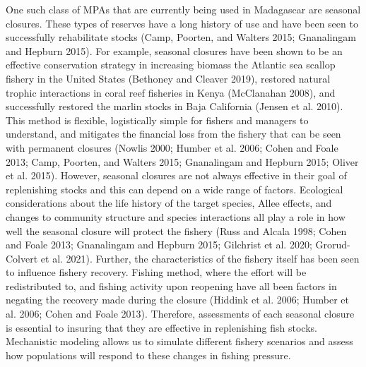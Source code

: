 \documentclass[
]{article}
\begin{document}
One such class of MPAs that are currently being used in Madagascar are seasonal closures. These types of reserves have a long history of use and have been seen to successfully rehabilitate stocks (Camp, Poorten, and Walters 2015; Gnanalingam and Hepburn 2015). For example, seasonal closures have been shown to be an effective conservation strategy in increasing biomass the Atlantic sea scallop fishery in the United States (Bethoney and Cleaver 2019), restored natural trophic interactions in coral reef fisheries in Kenya (McClanahan 2008), and successfully restored the marlin stocks in Baja California (Jensen et al. 2010). This method is flexible, logistically simple for fishers and managers to understand, and mitigates the financial loss from the fishery that can be seen with permanent closures (Nowlis 2000; Humber et al. 2006; Cohen and Foale 2013; Camp, Poorten, and Walters 2015; Gnanalingam and Hepburn 2015; Oliver et al. 2015). However, seasonal closures are not always effective in their goal of replenishing stocks and this can depend on a wide range of factors. Ecological considerations about the life history of the target species, Allee effects, and changes to community structure and species interactions all play a role in how well the seasonal closure will protect the fishery (Russ and Alcala 1998; Cohen and Foale 2013; Gnanalingam and Hepburn 2015; Gilchrist et al. 2020; Grorud-Colvert et al. 2021). Further, the characteristics of the fishery itself has been seen to influence fishery recovery. Fishing method, where the effort will be redistributed to, and fishing activity upon reopening have all been factors in negating the recovery made during the closure (Hiddink et al. 2006; Humber et al. 2006; Cohen and Foale 2013). Therefore, assessments of each seasonal closure is essential to insuring that they are effective in replenishing fish stocks. Mechanistic modeling allows us to simulate different fishery scenarios and assess how populations will respond to these changes in fishing pressure.
\end{document}
